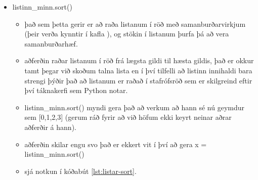 \begin{itemize}
	\item listinn\_minn.sort()
	\begin{itemize}
		\item það sem þetta gerir er að raða listanum í röð með samanburðarvirkjum (þeir verða kynntir í kafla ), og stökin í listanum þurfa þá að vera samanburðarhæf.
		\item aðferðin raðar listanum í röð frá lægsta gildi til hæsta gildis, það er okkur tamt þegar við skoðum talna lista en í því tilfelli að listinn innihaldi bara strengi þýðir það að listanum er raðað í stafrófsröð sem er skilgreind eftir því táknakerfi sem Python notar.
		\item listinn\_minn.sort() myndi gera það að verkum að hann sé nú geymdur sem [0,1,2,3] (gerum ráð fyrir að við höfum ekki keyrt neinar aðrar aðferðir á hann).
		\item aðferðin skilar engu svo það er ekkert vit í því að gera x = listinn\_minn.sort()
		\item sjá notkun í kóðabút \ref{lst:listar-sort}.
	\end{itemize}
	
\end{itemize}

